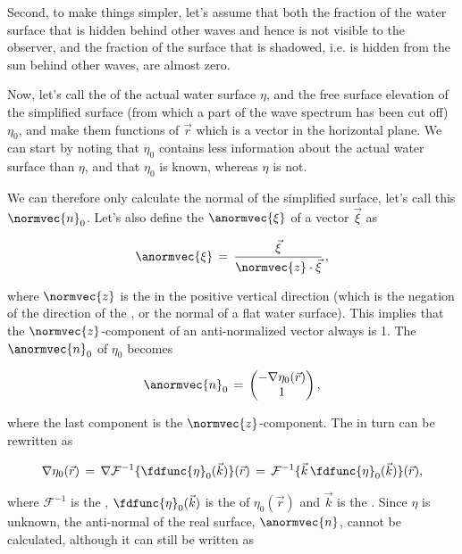 {Second, to make things simpler, let's assume that both the fraction of the water surface that is hidden behind other waves and hence is not visible to the observer, and the fraction of the surface that is shadowed, i.e. is hidden from the sun behind other waves, are almost zero.

Now, let's call the  of the actual water surface $\eta$, and the free surface elevation of the simplified surface (from which a part of the wave spectrum has been cut off) $\eta_0$, and make them functions of $\vec{r}$ which is a \twodimensional vector in the horizontal plane. We can start by noting that $\eta_0$ contains less information about the actual water surface than $\eta$, and that $\eta_0$ is known, whereas $\eta$ is not.

We can therefore only calculate the normal of the simplified surface, let's call this $\normvec{n}_0$. Let's also define the  $\anormvec{\xi}$ of a vector $\vec{\xi}$ as

\begin{equation}
\anormvec{\xi} \,=\, \frac{\vec{\xi}}{\normvec{z}\cdot\vec{\xi}}\,,
\end{equation}

where $\normvec{z}$ is the  in the positive vertical direction (which is the negation of the direction of the , or the normal of a flat water surface). This implies that the $\normvec{z}$-component of an anti-normalized vector always is 1. The  $\anormvec{n}_0$ of $\eta_0$ becomes

\begin{equation}
\anormvec{n}_0 \,=\, \left(\!\!\!\begin{array}{c}-\nabla\eta_0(\vec{r}) \\ 1\end{array}\!\!\!\right),
\end{equation}

where the last component is the $\normvec{z}$-component. The \gradient in turn can be rewritten as

\begin{equation}
\nabla\eta_0(\vec{r}) \,=\, \nabla\mathcal{F}^{-1}\{\fdfunc{\eta}_0(\vec{k})\}(\vec{r}) \,=\, \mathcal{F}^{-1}\{\vec{k}\,\fdfunc{\eta}_0(\vec{k})\}(\vec{r}),
\end{equation}

where $\mathcal{F}^{-1}$ is the , $\fdfunc{\eta}_0(\vec{k})$ is the  of $\eta_0(\vec{r})$ and $\vec{k}$ is the . Since $\eta$ is unknown, the anti-normal of the real surface, $\anormvec{n}$, cannot be calculated, although it can still be written as

}

